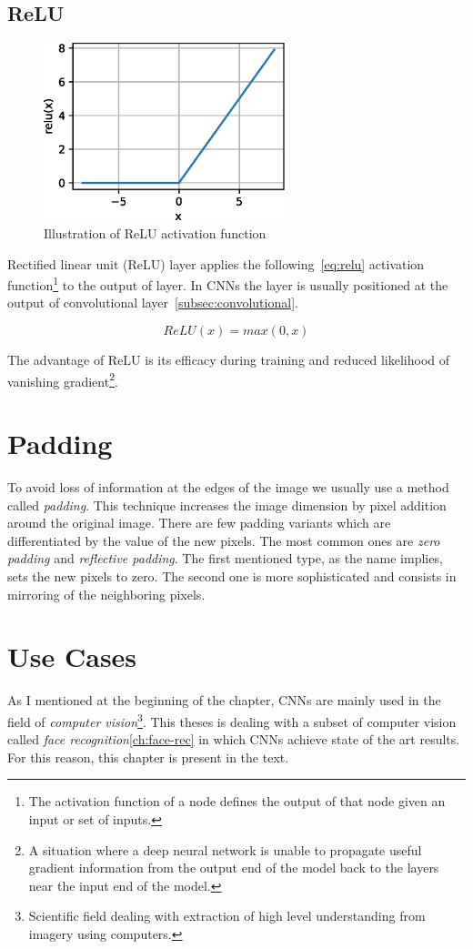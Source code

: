 \subsection{ReLU}\label{subsec:relu}

\begin{figure}
    \label{fig:relu}
    \includegraphics[width=7cm]{images/cnn/relu.eps}
    \caption{Illustration of ReLU activation function~\cite{ReLU}}
\end{figure}

Rectified linear unit (ReLU) layer applies the following~\ref{eq:relu} activation function\footnote{The activation
function of a node defines the output of that node given an input or set of inputs.} to the output of layer.
In CNNs the layer is usually positioned at the output of convolutional layer~\ref{subsec:convolutional}.

\begin{equation}\label{eq:relu}
    ReLU(x) = max(0,x)
\end{equation}

The advantage of ReLU is its efficacy during training and reduced likelihood of vanishing
gradient\footnote{\label{foot:vangrad}A situation where a deep neural network is unable to propagate useful gradient
information from the output end of the model back to the layers near the input end of the model.}.


\section{Padding}\label{sec:padding}
To avoid loss of information at the edges of the image we usually use a method called \textit{padding}.
This technique increases the image dimension by pixel addition around the original image.
There are few padding variants which are differentiated by the value of the new pixels.
The most common ones are \textit{zero padding} and \textit{reflective padding}.
The first mentioned type, as the name implies, sets the new pixels to zero.
The second one is more sophisticated and consists in mirroring of the neighboring pixels.

\section{Use Cases}\label{sec:use-cases}
As I mentioned at the beginning of the chapter, CNNs are mainly used in the field of
\textit{computer vision}\footnote{Scientific field dealing with extraction of high level understanding from imagery
using computers.}.
This theses is dealing with a subset of computer vision called \textit{face recognition}\ref{ch:face-rec} in which CNNs
achieve state of the art results.
For this reason, this chapter is present in the text.